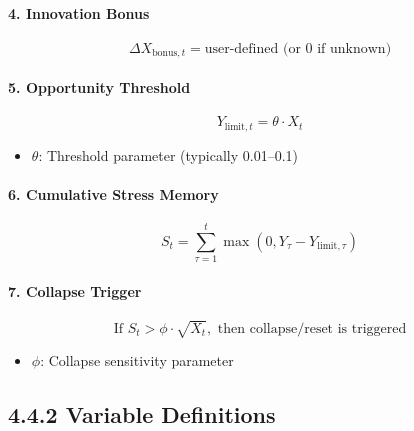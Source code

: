 \documentclass[12pt]{report}
\begin{document}
\vspace{0.5em}
\paragraph{4. Innovation Bonus}
\begin{equation}
\Delta X_{\text{bonus},t} = \text{user-defined (or } 0 \text{ if unknown)}
\end{equation}

\vspace{0.5em}
\paragraph{5. Opportunity Threshold}
\begin{equation}
Y_{\text{limit},t} = \theta \cdot X_t
\end{equation}
\begin{itemize}
  \item $\theta$: Threshold parameter (typically 0.01–0.1)
\end{itemize}

\vspace{0.5em}
\paragraph{6. Cumulative Stress Memory}
\begin{equation}
S_t = \sum_{\tau=1}^{t} \max(0, Y_\tau - Y_{\text{limit},\tau})
\end{equation}

\vspace{0.5em}
\paragraph{7. Collapse Trigger}
\begin{equation}
\text{If } S_t > \phi \cdot \sqrt{X_t}, \text{ then collapse/reset is triggered}
\end{equation}
\begin{itemize}
  \item $\phi$: Collapse sensitivity parameter
\end{itemize}

\subsection{4.4.2 Variable Definitions}
\end{document}
